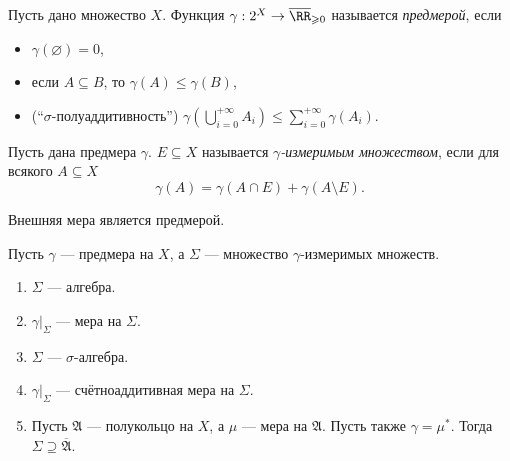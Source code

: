 \documentclass[12pt,a4paper]{article}
\begin{document}
    \begin{definition}
        Пусть дано множество $X$. Функция $\gamma: 2^X \to \overline{\RR}_{\geqslant 0}$ называется \emph{предмерой}, если
        \begin{itemize}
            \item $\gamma(\varnothing) = 0$,
            \item если $A \subseteq B$, то $\gamma(A) \leqslant \gamma(B)$,
            \item (``$\sigma$-полуаддитивность'') $\gamma(\bigcup_{i=0}^{+\infty} A_i) \leqslant \sum_{i=0}^{+\infty} \gamma(A_i)$.
        \end{itemize}

        Пусть дана предмера $\gamma$. $E \subseteq X$ называется \emph{$\gamma$-измеримым множеством}, если для всякого $A \subseteq X$
        \[\gamma(A) = \gamma(A \cap E) + \gamma(A \setminus E).\]
    \end{definition}

    \begin{lemma}
        Внешняя мера является предмерой.
    \end{lemma}

    \begin{theorem}
        Пусть $\gamma$ --- предмера на $X$, а $\Sigma$ --- множество $\gamma$-из\-ме\-ри\-мых множеств.
        \begin{enumerate}
            \item $\Sigma$ --- алгебра.
            \item $\gamma|_{\Sigma}$ --- мера на $\Sigma$.
            \item $\Sigma$ --- $\sigma$-алгебра.
            \item $\gamma|_\Sigma$ --- счётноаддитивная мера на $\Sigma$.
            \item Пусть $\mathfrak{A}$ --- полукольцо на $X$, а $\mu$ --- мера на $\mathfrak{A}$. Пусть также $\gamma = \mu^*$. Тогда $\Sigma \supseteq \overline{\mathfrak{A}}$.
        \end{enumerate}
    \end{theorem}
\end{document}
